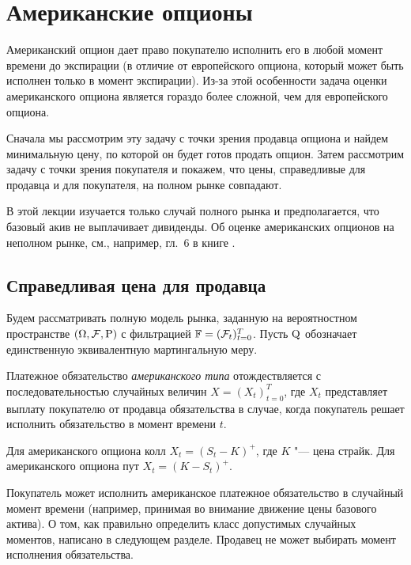 \chapter{Американские опционы}
\label{ch:american-discrete}
\chaptertoc

Американский опцион дает право покупателю исполнить его в любой момент времени до экспирации (в отличие от европейского опциона, который может быть исполнен только в момент экспирации).
Из-за этой особенности задача оценки американского опциона является гораздо более сложной, чем для европейского опциона. 

Сначала мы рассмотрим эту задачу с точки зрения продавца опциона и найдем минимальную цену, по которой он будет готов продать опцион.
Затем рассмотрим задачу с точки зрения покупателя и покажем, что цены, справедливые для продавца и для покупателя, на полном рынке совпадают.

В этой лекции изучается только случай полного рынка и предполагается, что базовый акив не выплачивает дивиденды.
Об оценке американских опционов на неполном рынке, см., например, гл.~6 в книге \cite{FollmerSchied11}.


\section{Справедливая цена для продавца}

Будем рассматривать полную модель рынка, заданную на вероятностном пространстве $(\Omega,\mathcal{F},\mathrm{P})$ с фильтрацией $\mathbb{F}=(\mathcal{F}_t)_{t=0}^T$.
Пусть $\mathrm{Q}$ обозначает единственную эквивалентную мартингальную меру.

\begin{definition}
Платежное обязательство \emph{американского типа} отождествляется с последовательностью случайных величин $X = (X_t)_{t=0}^T$, где $X_t$ представляет выплату покупателю от продавца обязательства в случае, когда покупатель решает исполнить обязательство в момент времени $t$.
\end{definition}

\begin{example}
Для американского опциона колл $X_t = (S_t - K)^+$, где $K$ "--- цена страйк.
Для американского опциона пут $X_t = (K - S_t)^+$.
\end{example}

\begin{remark}
Покупатель может исполнить американское платежное обязательство в случайный момент времени (например, принимая во внимание движение цены базового актива).
О том, как правильно определить класс допустимых случайных моментов, написано в следующем разделе.
Продавец не может выбирать момент исполнения обязательства.
\end{remark}

